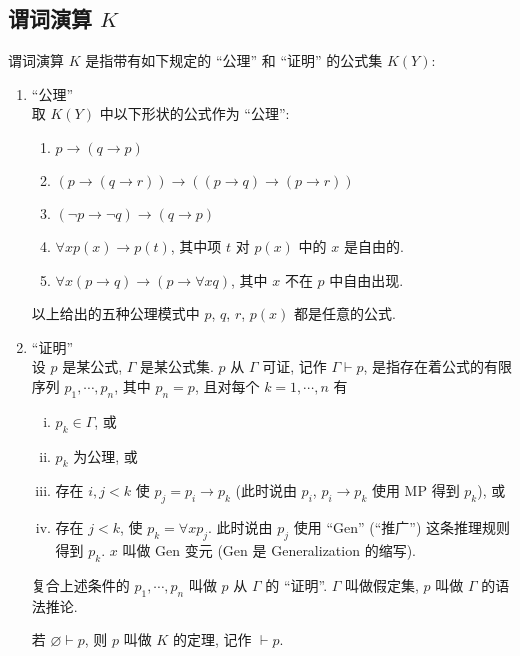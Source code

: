\documentclass[
    mode=hazy,
    color=blue,
    device=normal,
    lang=cn
]{elegantnote}
\begin{document}
\subsection{谓词演算 \texorpdfstring{$K$}{K}}
\begin{definition}[谓词演算 $K$]
    谓词演算 $K$ 是指带有如下规定的 ``公理'' 和 ``证明'' 的公式集 $K(Y)$:
    \begin{enumerate}[label = $\arabic*^\circ$]
        \item ``公理''\\
              取 $K(Y)$ 中以下形状的公式作为 ``公理'':
              \begin{enumerate}[label = (K\arabic*)]
                  \item $p\to (q\to p)$
                  \item $(p\to (q\to r))\to ((p\to q)\to (p\to r))$
                  \item $(\lnot p\to \lnot q)\to (q\to p)$
                  \item $\forall xp(x)\to p(t)$, 其中项 $t$ 对 $p(x)$ 中的 $x$ 是自由的.
                  \item $\forall x(p\to q)\to (p\to \forall xq)$, 其中 $x$ 不在 $p$ 中自由出现.
              \end{enumerate}
              以上给出的五种公理模式中 $p$, $q$, $r$, $p(x)$ 都是任意的公式.
        \item ``证明''\\
              设 $p$ 是某公式, $\Gamma$ 是某公式集. $p$ 从 $\Gamma$ 可证, 记作 $\Gamma\vdash p$, 是指存在着公式的有限序列 $p_1, \cdots, p_n$, 其中 $p_n = p$, 且对每个 $k=1, \cdots, n$ 有
              \begin{enumerate}[(i)]
                  \item $p_k\in \Gamma$, 或
                  \item $p_k$ 为公理, 或
                  \item 存在 $i, j <k$ 使 $p_j=p_i\to p_k$ (此时说由 $p_i$, $p_i\to p_k$ 使用 MP 得到 $p_k$), 或
                  \item 存在 $j<k$, 使 $p_k = \forall xp_j$. 此时说由 $p_j$ 使用 ``Gen'' (``推广'') 这条推理规则得到 $p_k$. $x$ 叫做 Gen 变元 (Gen 是 Generalization 的缩写).
              \end{enumerate}
              复合上述条件的 $p_1, \cdots, p_n$ 叫做 $p$ 从 $\Gamma$ 的 ``证明''. $\Gamma$ 叫做假定集, $p$ 叫做 $\Gamma$ 的语法推论.

              若 $\varnothing\vdash p$, 则 $p$ 叫做 $K$ 的定理, 记作 $\vdash p$.
    \end{enumerate}
\end{definition}
\end{document}
